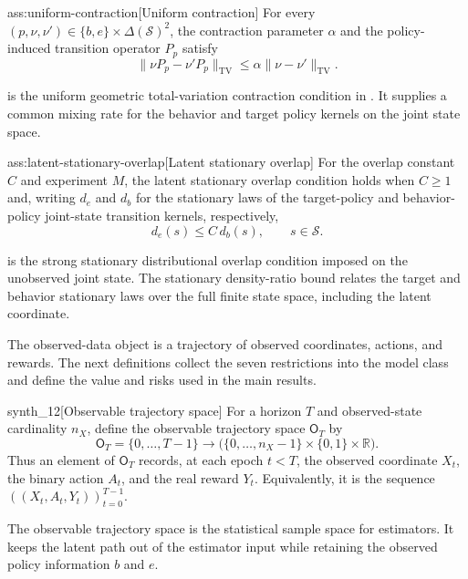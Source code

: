 \documentclass[11pt]{article}
\begin{document}
\begin{assumptionv}{ass:uniform-contraction}[Uniform contraction]
For every \((p,\nu,\nu')\in\{b,e\}\times\Delta(\mathcal S)^2\), the contraction parameter \(\alpha\) and the policy-induced transition operator \(P_p\) satisfy
\[
\|\nu P_p-\nu'P_p\|_{\mathrm{TV}}
\le
\alpha\|\nu-\nu'\|_{\mathrm{TV}}.
\]
\end{assumptionv}

 is the uniform geometric total-variation contraction condition in \citet{HuWager2023}. It supplies a common mixing rate for the behavior and target policy kernels on the joint state space.

\begin{assumptionv}{ass:latent-stationary-overlap}[Latent stationary overlap]
For the overlap constant \(C\) and experiment \(M\), the latent stationary overlap condition holds when \(C\ge 1\) and, writing \(d_e\) and \(d_b\) for the stationary laws of the target-policy and behavior-policy joint-state transition kernels, respectively,
\[
d_e(s)\le C\,d_b(s),
\qquad s\in\mathcal S .
\]
\end{assumptionv}

 is the strong stationary distributional overlap condition imposed on the unobserved joint state. The stationary density-ratio bound  relates the target and behavior stationary laws over the full finite state space, including the latent coordinate.

The observed-data object is a trajectory of observed coordinates, actions, and rewards. The next definitions collect the seven restrictions into the model class and define the value and risks used in the main results.

\begin{definitionv}{synth_12}[Observable trajectory space]
For a horizon \(T\) and observed-state cardinality \(n_X\), define the observable trajectory space \(\mathsf O_T\) by
\[
\mathsf O_T
=
\{0,\ldots,T-1\}\to
\bigl(\{0,\ldots,n_X-1\}\times\{0,1\}\times\mathbb R\bigr).
\]
Thus an element of \(\mathsf O_T\) records, at each epoch \(t<T\), the observed coordinate \(X_t\), the binary action \(A_t\), and the real reward \(Y_t\). Equivalently, it is the sequence \(((X_t,A_t,Y_t))_{t=0}^{T-1}\).
\end{definitionv}

The observable trajectory space  is the statistical sample space for estimators. It keeps the latent path out of the estimator input while retaining the observed policy information \(b\) and \(e\).
\end{document}
